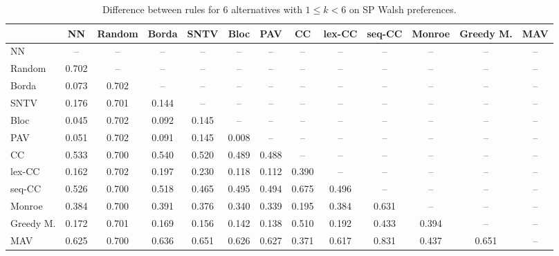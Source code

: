 
\begin{table*}[htbp]
\centering
\begin{tabular}{lcccccccccccc}
\toprule
 & NN & Random & Borda & SNTV & Bloc & PAV & CC & lex-CC & seq-CC & Monroe & Greedy M. & MAV \\
\midrule
NN & -- & -- & -- & -- & -- & -- & -- & -- & -- & -- & -- & -- \\
Random & \cellcolor{blue!70} 0.702 & -- & -- & -- & -- & -- & -- & -- & -- & -- & -- & -- \\
Borda & \cellcolor{blue!7} 0.073 & \cellcolor{blue!70} 0.702 & -- & -- & -- & -- & -- & -- & -- & -- & -- & -- \\
SNTV & \cellcolor{blue!17} 0.176 & \cellcolor{blue!70} 0.701 & \cellcolor{blue!14} 0.144 & -- & -- & -- & -- & -- & -- & -- & -- & -- \\
Bloc & \cellcolor{blue!4} 0.045 & \cellcolor{blue!70} 0.702 & \cellcolor{blue!9} 0.092 & \cellcolor{blue!14} 0.145 & -- & -- & -- & -- & -- & -- & -- & -- \\
PAV & \cellcolor{blue!5} 0.051 & \cellcolor{blue!70} 0.702 & \cellcolor{blue!9} 0.091 & \cellcolor{blue!14} 0.145 & \cellcolor{blue!0} 0.008 & -- & -- & -- & -- & -- & -- & -- \\
CC & \cellcolor{blue!53} 0.533 & \cellcolor{blue!70} 0.700 & \cellcolor{blue!54} 0.540 & \cellcolor{blue!52} 0.520 & \cellcolor{blue!48} 0.489 & \cellcolor{blue!48} 0.488 & -- & -- & -- & -- & -- & -- \\
lex-CC & \cellcolor{blue!16} 0.162 & \cellcolor{blue!70} 0.702 & \cellcolor{blue!19} 0.197 & \cellcolor{blue!23} 0.230 & \cellcolor{blue!11} 0.118 & \cellcolor{blue!11} 0.112 & \cellcolor{blue!39} 0.390 & -- & -- & -- & -- & -- \\
seq-CC & \cellcolor{blue!52} 0.526 & \cellcolor{blue!70} 0.700 & \cellcolor{blue!51} 0.518 & \cellcolor{blue!46} 0.465 & \cellcolor{blue!49} 0.495 & \cellcolor{blue!49} 0.494 & \cellcolor{blue!67} 0.675 & \cellcolor{blue!49} 0.496 & -- & -- & -- & -- \\
Monroe & \cellcolor{blue!38} 0.384 & \cellcolor{blue!70} 0.700 & \cellcolor{blue!39} 0.391 & \cellcolor{blue!37} 0.376 & \cellcolor{blue!34} 0.340 & \cellcolor{blue!33} 0.339 & \cellcolor{blue!19} 0.195 & \cellcolor{blue!38} 0.384 & \cellcolor{blue!63} 0.631 & -- & -- & -- \\
Greedy M. & \cellcolor{blue!17} 0.172 & \cellcolor{blue!70} 0.701 & \cellcolor{blue!16} 0.169 & \cellcolor{blue!15} 0.156 & \cellcolor{blue!14} 0.142 & \cellcolor{blue!13} 0.138 & \cellcolor{blue!51} 0.510 & \cellcolor{blue!19} 0.192 & \cellcolor{blue!43} 0.433 & \cellcolor{blue!39} 0.394 & -- & -- \\
MAV & \cellcolor{blue!62} 0.625 & \cellcolor{blue!70} 0.700 & \cellcolor{blue!63} 0.636 & \cellcolor{blue!65} 0.651 & \cellcolor{blue!62} 0.626 & \cellcolor{blue!62} 0.627 & \cellcolor{blue!37} 0.371 & \cellcolor{blue!61} 0.617 & \cellcolor{blue!83} 0.831 & \cellcolor{blue!43} 0.437 & \cellcolor{blue!65} 0.651 & -- \\
\bottomrule
\end{tabular}

\caption{Difference between rules for 6 alternatives with $1 \leq k < 6$ on SP Walsh preferences.}
\label{tab:rule_distance_heatmap-m=[6]-pref_dist=single_peaked_walsh}
\end{table*}
    